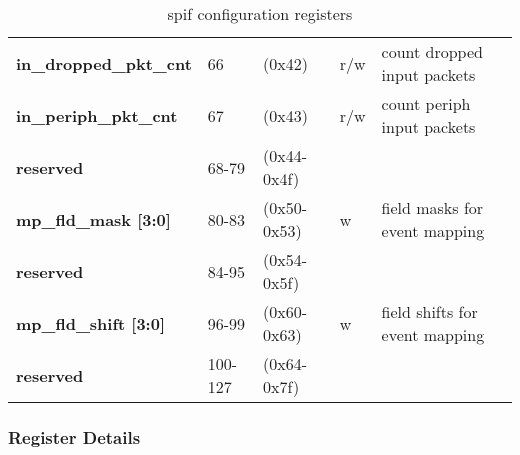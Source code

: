 \documentclass[11pt,a4paper,twoside]{article}
\begin{document}
\begin{center}
\begin{table}[!h]
\begin{tabularx}{\textwidth}{| p{34mm} p{13mm} p{21mm} p{7mm} X |}
		\textbf{in\_dropped\_pkt\_cnt}       & 66                         & (0x42)                         & r/w                 & count dropped input packets \\%
		\textbf{in\_periph\_pkt\_cnt}        & 67                         & (0x43)                         & r/w                 & count periph input packets\\%
		\cellcolor{gray!25}\textbf{reserved} & \cellcolor{gray!25}68-79   & \cellcolor{gray!25}(0x44-0x4f) & \cellcolor{gray!25} & \cellcolor{gray!25}\\%
		\textbf{mp\_fld\_mask [3:0]}         & 80-83                      & (0x50-0x53)                    & w                   & field masks for event mapping \\%
		\cellcolor{gray!25}\textbf{reserved} & \cellcolor{gray!25}84-95   & \cellcolor{gray!25}(0x54-0x5f) & \cellcolor{gray!25} & \cellcolor{gray!25}\\%
		\textbf{mp\_fld\_shift [3:0]}        & 96-99                      & (0x60-0x63)                    & w                   & field shifts for event mapping  \\%
		\cellcolor{gray!25}\textbf{reserved} & \cellcolor{gray!25}100-127 & \cellcolor{gray!25}(0x64-0x7f) & \cellcolor{gray!25} & \cellcolor{gray!25}\\%
		\hline
	\end{tabularx}
	\caption{spif configuration registers}
	\label{tab:spif_regs}
\end{table}
\end{center}


\subsubsection*{Register Details}
\end{document}
